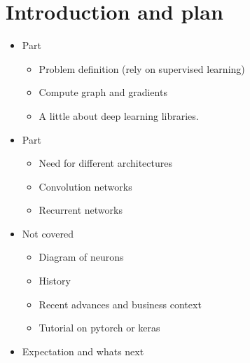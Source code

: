 \section{Introduction and plan}
\begin{frame}{}
	\begin{itemize}
		\item Part 	
			\begin{itemize}
				\item Problem definition (rely on supervised learning)
				\item Compute graph and gradients 
				\item A little about deep learning libraries. 
			\end{itemize}
		\item Part 
			\begin{itemize}
				\item Need for different architectures
				\item Convolution networks 
				\item Recurrent networks  
			\end{itemize}
		\item Not covered 
			\begin{itemize}
				\item Diagram of neurons 
				\item History  
				\item Recent advances and business context
				\item Tutorial on pytorch or keras 
			\end{itemize}
		\item Expectation and whats next
	\end{itemize}
\end{frame}